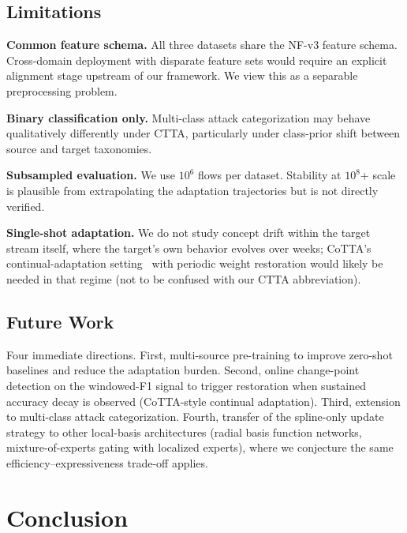 \documentclass[10pt, conference, letterpaper]{IEEEtran}
\begin{document}
\subsection{Limitations}

\textbf{Common feature schema.} All three datasets share the NF-v3 feature schema. Cross-domain deployment with disparate feature sets would require an explicit alignment stage upstream of our framework. We view this as a separable preprocessing problem.

\textbf{Binary classification only.} Multi-class attack categorization may behave qualitatively differently under CTTA, particularly under class-prior shift between source and target taxonomies.

\textbf{Subsampled evaluation.} We use $10^6$ flows per dataset. Stability at $10^8$+ scale is plausible from extrapolating the adaptation trajectories but is not directly verified.

\textbf{Single-shot adaptation.} We do not study concept drift within the target stream itself, where the target's own behavior evolves over weeks; CoTTA's continual-adaptation setting~\cite{wang2022cotta} with periodic weight restoration would likely be needed in that regime (not to be confused with our CTTA abbreviation).

\subsection{Future Work}

Four immediate directions. First, multi-source pre-training to improve zero-shot baselines and reduce the adaptation burden. Second, online change-point detection on the windowed-F1 signal to trigger restoration when sustained accuracy decay is observed (CoTTA-style continual adaptation). Third, extension to multi-class attack categorization. Fourth, transfer of the spline-only update strategy to other local-basis architectures (radial basis function networks, mixture-of-experts gating with localized experts), where we conjecture the same efficiency--expressiveness trade-off applies.


\section{Conclusion}
\label{sec:conclusion}
\end{document}
